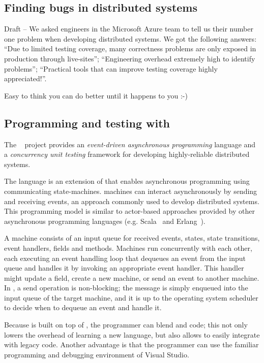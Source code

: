 \subsection{Finding bugs in distributed systems}
\label{bg:bugs}

Draft -- We asked engineers in the Microsoft Azure team to tell us their number one problem when developing distributed systems. We got the following answers: ``Due to limited testing coverage, many correctness problems are only exposed in production through live-sites''; ``Engineering overhead extremely high to identify problems''; ``Practical tools that can improve testing coverage highly appreciated!''.

Easy to think you can do better until it happens to you :-)

\subsection{Programming and testing with \psharp}
\label{bg:psharp}

The \psharp~\cite{deligiannis2015psharp} project provides an \emph{event-driven asynchronous programming} language and a \emph{concurrency unit testing} framework for developing highly-reliable distributed systems.

The \psharp language is an extension of \csharp that enables asynchronous programming using communicating state-machines. \psharp machines can interact asynchronously by sending and receiving events, an approach commonly used to develop distributed systems. This programming model is similar to actor-based approaches provided by other asynchronous programming languages (e.g. Scala~\cite{odersky2008programming} and Erlang~\cite{armstrong1996erlang}).

A \psharp machine consists of an input queue for received events, states, state transitions, event handlers, fields and methods. Machines run concurrently with each other, each executing an event handling loop that dequeues an event from the input queue and handles it by invoking an appropriate event handler. This handler might update a field, create a new machine, or send an event to another machine. In \psharp, a send operation is non-blocking; the message is simply enqueued into the input queue of the target machine, and it is up to the operating system scheduler to decide when to dequeue an event and handle it.

Because \psharp is built on top of \csharp, the programmer can blend \psharp and \csharp code; this not only lowers the overhead of learning a new language, but also allows \psharp to easily integrate with legacy code. Another advantage is that the programmer can use the familiar programming and debugging environment of Visual Studio.

